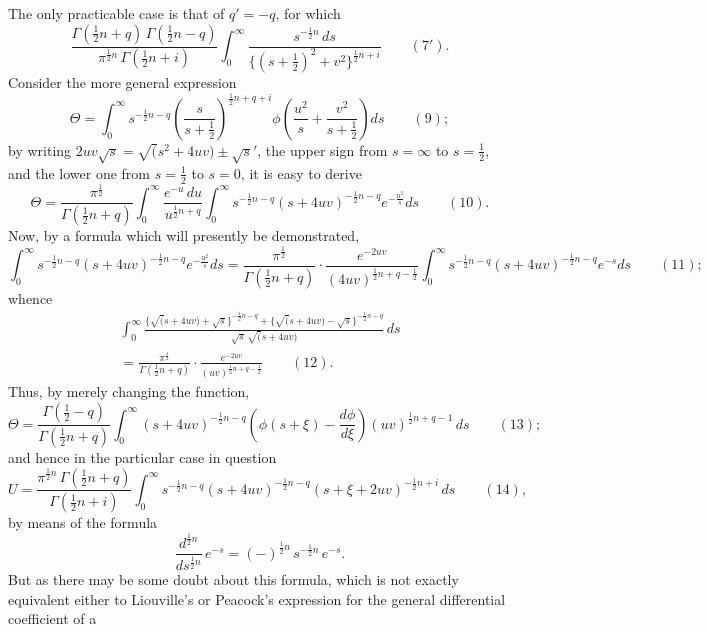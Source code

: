 \documentclass[11pt,a4paper]{article}
\begin{document}
\newpage
The only practicable case is that of $q' = -q$, for which
\[
\frac{\Gamma(\frac{1}{2}n+q)\,\Gamma(\frac{1}{2}n-q)}{\pi^{\frac{1}{2}n}\,\Gamma(\frac{1}{2}n+i)} \int_0^\infty \frac{s^{-\frac{1}{2}n}\,ds}{\{(s+\frac{1}{2})^2 + v^2\}^{\frac{1}{2}n+i}} \qquad(7').
\]
Consider the more general expression
\[
\Theta = \int_0^\infty s^{-\frac{1}{2}n-q} \left(\frac{s}{s+\frac{1}{2}}\right)^{\frac{1}{2}n+q+i} \phi\left(\frac{u^2}{s} + \frac{v^2}{s+\frac{1}{2}}\right) ds \qquad(9);
\]
by writing $2uv\surd s = \surd(s^2 + 4uv) \pm \surd s'$,
the upper sign from $s = \infty$ to $s = \frac{1}{2}$, and the lower one from $s = \frac{1}{2}$ to $s = 0$, it is easy to derive
\[
\Theta = \frac{\pi^{\frac{1}{2}}}{\Gamma(\frac{1}{2}n+q)} \int_0^\infty \frac{e^{-u}\,du}{u^{\frac{1}{2}n+q}} \int_0^\infty s^{-\frac{1}{2}n-q} (s+4uv)^{-\frac{1}{2}n-q} e^{-\frac{u^2}{s}} ds \qquad(10).
\]
Now, by a formula which will presently be demonstrated,
\[
\int_0^\infty s^{-\frac{1}{2}n-q} (s+4uv)^{-\frac{1}{2}n-q} e^{-\frac{u^2}{s}} ds = \frac{\pi^{\frac{1}{2}}}{\Gamma(\frac{1}{2}n+q)} \cdot \frac{e^{-2uv}}{(4uv)^{\frac{1}{2}n+q-\frac{1}{2}}} \int_0^\infty s^{-\frac{1}{2}n-q} (s+4uv)^{-\frac{1}{2}n-q} e^{-s} ds \qquad(11);
\]
whence
\begin{multline*}
\int_0^\infty \frac{\{\surd(s+4uv) + \surd s\}^{-\frac{1}{2}n-q} + \{\surd(s+4uv) - \surd s\}^{-\frac{1}{2}n-q}}{\surd s\,\surd(s+4uv)}\,ds \\
= \frac{\pi^{\frac{1}{2}}}{\Gamma(\frac{1}{2}n+q)} \cdot \frac{e^{-2uv}}{(uv)^{\frac{1}{2}n+q-\frac{1}{2}}} \qquad(12).
\end{multline*}
Thus, by merely changing the function,
\[
\Theta = \frac{\Gamma(\frac{1}{2}-q)}{\Gamma(\frac{1}{2}n+q)} \int_0^\infty (s+4uv)^{-\frac{1}{2}n-q} \left(\phi(s+\xi) - \frac{d\phi}{d\xi}\right) (uv)^{\frac{1}{2}n+q-1}\,ds \qquad(13);
\]
and hence in the particular case in question
\[
U = \frac{\pi^{\frac{1}{2}n}\,\Gamma(\frac{1}{2}n+q)}{\Gamma(\frac{1}{2}n+i)} \int_0^\infty s^{-\frac{1}{2}n-q} (s+4uv)^{-\frac{1}{2}n-q} (s+\xi+2uv)^{-\frac{1}{2}n+i}\,ds \qquad(14),
\]
by means of the formula
\[
\frac{d^{\frac{1}{2}n}}{ds^{\frac{1}{2}n}}\,e^{-s} = (-)^{\frac{1}{2}n}\,s^{-\frac{1}{2}n}\,e^{-s}.
\]
But as there may be some doubt about this formula, which is not exactly equivalent either to Liouville's or Peacock's expression for the general differential coefficient of a
\end{document}
